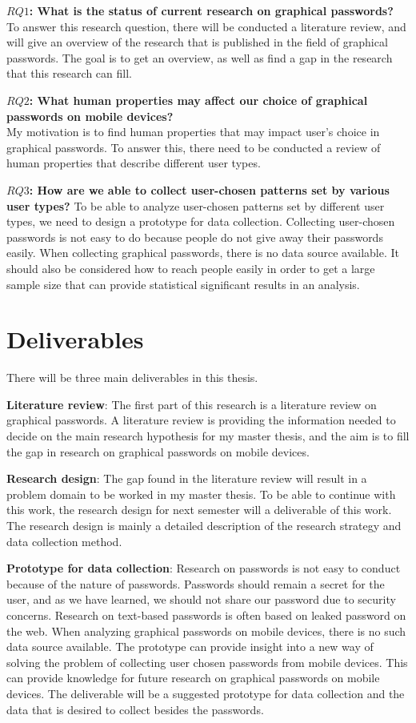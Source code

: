   {\bf $RQ1$: What is the status of current research on graphical passwords?} \\
  To answer this research question, there will be conducted a literature review, and will give an overview of the research that is published in the field of graphical passwords. The goal is to get an overview, as well as find a gap in the research that this research can fill.

  {\bf $RQ2$: What human properties may affect our choice of graphical passwords on mobile devices?}\\
  My motivation is to find human properties that may impact user's choice in graphical passwords. To answer this, there need to be conducted a review of human properties that describe different user types.

  {\bf $RQ3$: How are we able to collect user-chosen patterns set by various user types?}
  To be able to analyze user-chosen patterns set by different user types, we need to design a prototype for data collection. Collecting user-chosen passwords is not easy to do because people do not give away their passwords easily. When collecting graphical passwords, there is no data source available. It should also be considered how to reach people easily in order to get a large sample size that can provide statistical significant results in an analysis.

  \section{Deliverables} \label{sec:deliverables}

  There will be three main deliverables in this thesis.

  {\bf Literature review}: The first part of this research is a literature review on graphical passwords. A literature review is providing the information needed to decide on the main research hypothesis for my master thesis, and the aim is to fill the gap in research on graphical passwords on mobile devices.

  {\bf Research design}: The gap found in the literature review will result in a problem domain to be worked in my master thesis. To be able to continue with this work, the research design for next semester will a deliverable of this work. The research design is mainly a detailed description of the research strategy and data collection method.

  {\bf Prototype for data collection}: Research on passwords is not easy to conduct because of the nature of passwords. Passwords should remain a secret for the user, and as we have learned, we should not share our password due to security concerns. Research on text-based passwords is often based on leaked password on the web. When analyzing graphical passwords on mobile devices, there is no such data source available. The prototype can provide insight into a new way of solving the problem of collecting user chosen passwords from mobile devices. This can provide knowledge for future research on graphical passwords on mobile devices. The deliverable will be a suggested prototype for data collection and the data that is desired to collect besides the passwords.

